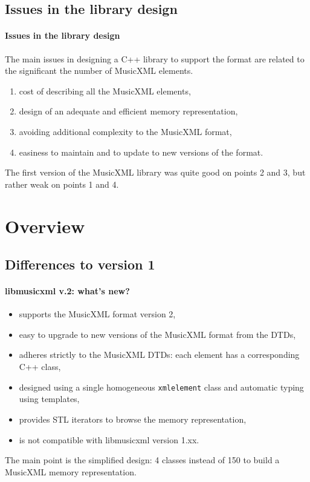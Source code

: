 \documentclass{beamer}
\begin{document}
\section{Issues in the library design}
\begin{frame}
	\frametitle{Issues in the library design}
	The main issues in designing a C++ library to support the format are related to the significant
	the number of MusicXML elements.
	\begin{enumerate}
		\item cost of describing all the MusicXML elements,
		\item design of an adequate and efficient memory representation,
		\item avoiding additional complexity to the MusicXML format,
		\item easiness to maintain and to update to new versions of the format.
	\end{enumerate}

	\begin{block}{}
	The first version of the MusicXML library was quite good on points 2 and 3, but rather weak
	on points 1 and 4.
	\end{block}
\end{frame}


\chapter{Overview}
\section{Differences to version 1}
\begin{frame}
	\frametitle{libmusicxml v.2: what's new?}
	
\begin{itemize}
		\item supports the MusicXML format version 2,
		\item easy to upgrade to new versions of the MusicXML format from the DTDs,
		\item adheres strictly to the MusicXML DTDs: each element has a corresponding C++ class,
		\item designed using a single homogeneous \texttt{xmlelement} class   and automatic
		typing using templates,
		\item provides STL iterators to browse the memory representation,
		\item is \alert{not compatible} with libmusicxml version 1.xx.
	\end{itemize}
	\begin{block}{}
	The main point is the simplified design: 4 classes instead of 150 to build a MusicXML
	memory representation.
	\end{block}
\end{frame}
\end{document}
